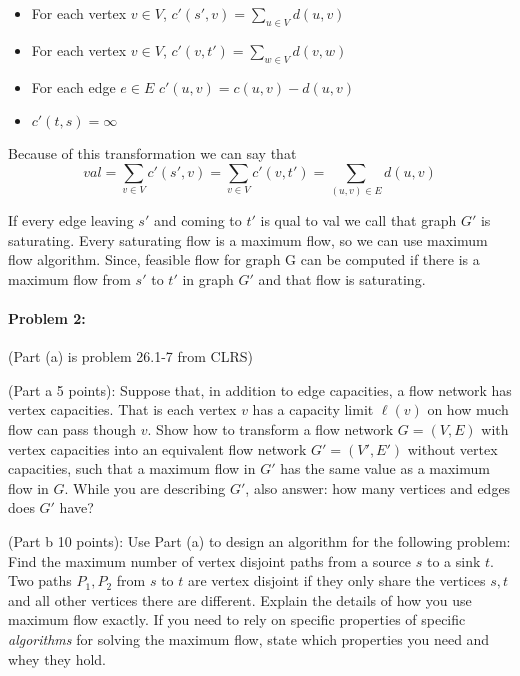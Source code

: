 \begin{itemize}
    \item For each vertex $v \in V$, $c'(s',v)=\sum_{u\in V}d(u,v)$
    \item For each vertex $v \in V$, $c'(v,t')=\sum_{w \in V}d(v,w)$
    \item For each edge $e \in E$ $c'(u,v)=c(u,v)-d(u,v)$
    \item $c'(t,s)=\infty$
\end{itemize}
Because of this transformation we can say that 
\[val=\sum_{v\in V}c'(s',v)=\sum_{v \in V}c'(v,t')=\sum_{(u,v) \in E}d(u,v)\]

If every edge leaving $s'$ and coming to $t'$ is qual to val we call that graph $G'$ is saturating. Every saturating flow is a maximum flow, so we can use maximum flow algorithm. Since, feasible flow for graph G can be computed if there is a maximum flow from $s'$ to $t'$ in graph $G'$ and that flow is saturating. 
\newpage
\paragraph{Problem 2:} (Part (a) is problem 26.1-7 from CLRS)

(Part a 5 points): Suppose that, in addition to edge capacities, a flow network has vertex capacities.
That is each vertex $v$ has a capacity limit $\ell(v)$ on how much flow can pass though $v$. Show
how to transform a flow network $G=(V,E)$ with vertex capacities into an equivalent
flow network $G'=(V',E')$ without vertex capacities, such that a maximum flow in $G'$ has the same value as a maximum flow in $G$. While you are describing $G'$, also answer: how many vertices and edges does $G'$ have?


(Part b 10 points): Use Part (a) to design an algorithm for the following problem: Find the maximum number of vertex disjoint paths from a source $s$ to a sink $t$. Two paths $P_1,P_2$ from $s$ to $t$ are vertex disjoint if they only share the vertices $s,t$ and all other vertices there are different. Explain the details of how you use maximum flow exactly. If you need to rely on specific properties of specific \emph{algorithms} for solving the maximum flow, state which properties you need and whey they hold.

